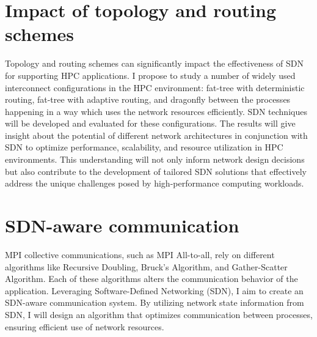 \section{Impact of topology and routing schemes}
\begin{comment}
The project tries to evaluate all the SDN enhanced routing schemes, two single path routing and one multipath
routing, with both the widely popular static routing scheme in fat-tree called D-mod-k and the adaptive 
routing which is used in fat-trees. All the routing is schemes are evaluted on two different size
topologies, one mid-sized topology of 512 compute nodes and large-sized topology of 1024 compute
nodes. The project evalutes the developed techniques across 5 different applications, which are random permutation,
near neighbour, nekbone, lammps and milc; discussed the applications in chapter 2. 
\end{comment}
Topology and routing schemes can significantly impact the effectiveness
of SDN for supporting HPC applications. I propose to study a number of
widely used interconnect configurations in the HPC environment: fat-tree
with deterministic routing, fat-tree with adaptive routing, and dragonfly
between the processes happening in a way which uses the network resources efficiently.
 SDN techniques will be developed and evaluated for
these configurations. 
The results will give insight about the potential of different network architectures in conjunction with SDN to optimize performance, scalability, and resource utilization in HPC environments. This understanding will not only inform network design decisions but also contribute to the development of tailored SDN solutions that effectively address the unique challenges posed by high-performance computing workloads.


\section{SDN-aware communication}
MPI collective communications, such as MPI All-to-all, rely on different algorithms like Recursive Doubling, Bruck's Algorithm, and Gather-Scatter Algorithm. Each of these algorithms alters the communication behavior of the application. Leveraging Software-Defined Networking (SDN), I aim to create an SDN-aware communication system. By utilizing network state information from SDN, I will design an algorithm that optimizes communication between processes, ensuring efficient use of network resources.

